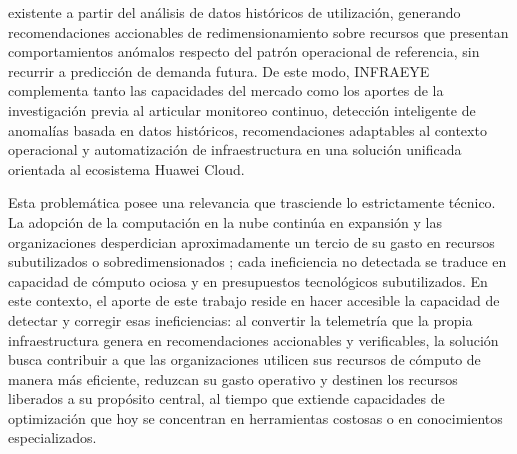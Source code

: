 existente a partir del análisis de datos históricos de utilización, generando recomendaciones accionables de redimensionamiento sobre recursos que presentan comportamientos anómalos respecto del patrón operacional de referencia, sin recurrir a predicción de demanda futura. De este modo, INFRAEYE complementa tanto las capacidades del mercado como los aportes de la investigación previa al articular monitoreo continuo, detección inteligente de anomalías basada en datos históricos, recomendaciones adaptables al contexto operacional y automatización de infraestructura en una solución unificada orientada al ecosistema Huawei Cloud.

Esta problemática posee una relevancia que trasciende lo estrictamente técnico. La adopción de la computación en la nube continúa en expansión y las organizaciones desperdician aproximadamente un tercio de su gasto en recursos subutilizados o sobredimensionados \parencite{Flexera2023}; cada ineficiencia no detectada se traduce en capacidad de cómputo ociosa y en presupuestos tecnológicos subutilizados. En este contexto, el aporte de este trabajo reside en hacer accesible la capacidad de detectar y corregir esas ineficiencias: al convertir la telemetría que la propia infraestructura genera en recomendaciones accionables y verificables, la solución busca contribuir a que las organizaciones utilicen sus recursos de cómputo de manera más eficiente, reduzcan su gasto operativo y destinen los recursos liberados a su propósito central, al tiempo que extiende capacidades de optimización que hoy se concentran en herramientas costosas o en conocimientos especializados.
